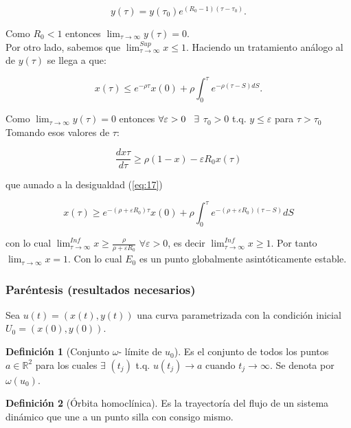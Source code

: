 \documentclass[10pt,oneside]{article}
\theoremstyle{definition}
\newtheorem{definition}{Definición}[section]
\begin{document}
\begin{multicols}{2}
    $$y(\tau)=y(\tau_0)e^{(R_0-1)(\tau-\tau_0)}.$$ 

    Como $R_0<1$ entonces $\displaystyle{\lim_{\tau \to \infty}}y(\tau)=0$.\\ \newline Por otro lado, sabemos que $\lim_{\tau\to \infty}^{Sup} x\leq1$. Haciendo un tratamiento análogo al de $y(\tau)$ se llega a que:
    
    \begin{equation}\label{eq:17}
    x(\tau)\leq e^{-\rho\tau}x(0)+\rho\int_0^{\tau}e^{-\rho(\tau-S)dS}.
    \end{equation}

    Como $\displaystyle{\lim_{\tau \to \infty}}y(\tau)=0$ entonces $\forall\varepsilon>0\hspace{0.3cm}\exists$ $\tau_0>0$ t.q. $y\leq\varepsilon$ para $\tau>\tau_0$ Tomando esos valores de $\tau$:

    $$\frac{dx\tau}{d\tau}\geq \rho(1-x)-\varepsilon R_0x(\tau)$$

    que aunado a la desigualdad (\ref{eq:17})

    $$x(\tau)\geq e^{-(\rho+\varepsilon R_0)\tau}x(0)+\rho\int_0^{\tau}e^{-(\rho+\varepsilon R_0) (\tau-S)}dS$$

    con lo cual $\lim_{\tau\to\infty}^{Inf}x\geq\frac{\rho}{\rho+\varepsilon R_0}$ $\forall\varepsilon>0$, es decir  $\lim_{\tau\to\infty}^{Inf}x\geq1$. Por tanto $\lim_{\tau\to\infty}x=1$. Con lo cual $E_0$ es un punto globalmente asintóticamente estable.

    \subsubsection{Paréntesis (resultados necesarios)}

    Sea $u(t)=(x(t), y(t))$ una curva parametrizada con la condición inicial $U_0=(x(0),y(0))$.   

    \begin{definition}[Conjunto $\omega$- límite de $u_0$]
        Es el conjunto de todos los puntos $a\in \mathbb{R}^2$ para los cuales $\exists$  $(t_j)$ t.q. $u(t_j)\to a$ cuando $t_j\to \infty$. Se denota por $\omega(u_0)$.
    \end{definition}

    \begin{definition}[Órbita  homoclínica]
        Es la trayectoría del flujo de un sistema dinámico que une a un punto silla con consigo mismo.
    \end{definition}
    

\end{multicols}
\end{document}
